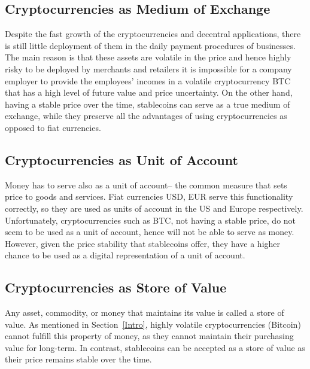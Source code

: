 \subsection{Cryptocurrencies as Medium of Exchange}
Despite the fast growth of the cryptocurrencies and decentral applications, there is still little deployment of them in the daily payment procedures of businesses. The main reason is that these assets are volatile in the price and hence highly risky to be deployed by merchants and retailers \ie it is impossible for a company employer to provide the employees' incomes in a volatile cryptocurrency \eg BTC that has a high level of future value and price uncertainty. On the other hand, having a stable price over the time, stablecoins can serve as a true medium of exchange, while they preserve all the advantages of using cryptocurrencies as opposed to fiat currencies.

\subsection{Cryptocurrencies as Unit of Account}
Money has to serve also as a unit of account-- the common measure that sets price to goods and services. Fiat currencies \eg USD, EUR \etc serve this functionality correctly, so they are used as units of account in the US and Europe respectively. Unfortunately, cryptocurrencies such as BTC, not having a stable price, do not seem to be used as a unit of account, hence will not be able to serve as money. However, given the price stability that stablecoins offer, they have a higher chance to be used as a digital representation of a unit of account.

\subsection{Cryptocurrencies as Store of Value}
Any asset, commodity, or money that maintains its value is called a store of value. As mentioned in Section~\ref{Intro}, highly volatile cryptocurrencies (\ie Bitcoin) cannot fulfill this property of money, as they cannot maintain their purchasing value for long-term. In contrast, stablecoins can be accepted as a store of value as their price remains stable over the time.

